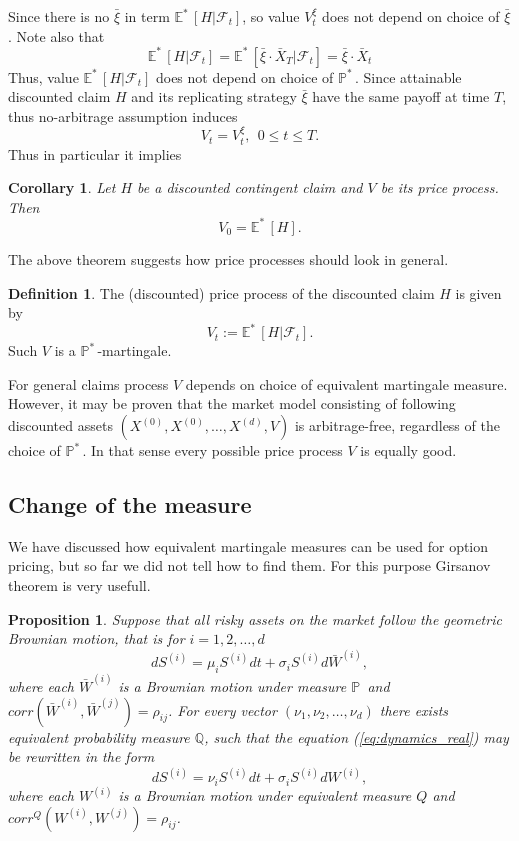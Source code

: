 \documentclass[a4paper,12pt, oneside]{book}
\newtheorem{prop}[thm]{Proposition}
\newtheorem{coro}[thm]{Corollary}
\theoremstyle{definition}
\newtheorem{mydef}{Definition}[section]
\theoremstyle{remark}
\def\P{{\mathbb{P}}\,}
\def\Em{{\mathbb{E}^*}\,}
\def\Pm{{\mathbb{P}}^*\,}
\def\Xa{\bar{X}}
\def\xia{\bar{\xi}}
\begin{document}
Since there is no $\xia$ in term $\Em[H | \mathcal{F}_t]$, so value $V^\xi_t$ does not depend on choice of $\xia$. Note also that
\begin{equation*}
 \Em[H | \mathcal{F}_t]  = \Em[\xia \cdot \Xa_T | \mathcal{F}_t]  = \xia \cdot \Xa_t
\end{equation*}
Thus, value $\Em[H | \mathcal{F}_t]$ does not depend on choice of $\Pm$. 
Since attainable discounted claim $H$ and its replicating strategy $\xia$ have the same payoff at time $T$, thus no-arbitrage assumption induces
\[ V_t = V^\xi_t,\ \ 0 \leq t \leq T. \]
Thus in particular it implies
\begin{coro}
\label{coro:price_mth}
Let $H$ be a discounted contingent claim and $V$ be its price process. Then
\begin{equation}
 \label{eq:price_mtg}
 V_0 = \Em[H].
\end{equation}
\end{coro}


The above theorem suggests how price processes should look in general.
\begin{mydef}
 The (discounted) price process of the discounted claim $H$ is given by
 \begin{equation*}
  V_t := \Em[H | \mathcal{F}_t].
 \end{equation*}
 Such $V$ is a $\Pm$-martingale.
\end{mydef}
For general claims process $V$ depends on choice of equivalent martingale measure. However, it may be proven that the market model consisting of following discounted assets $(X^{(0)}, X^{(0)},\ldots,X^{(d)}, V)$ is arbitrage-free, regardless of the choice of $\Pm$. In that sense every possible price process $V$ is equally good.

\subsection{Change of the measure}
We have discussed how equivalent martingale measures can be used for option pricing, but so far we did not tell how to find them. For this purpose Girsanov theorem is very usefull.

\begin{prop}
\label{prop:measure_change}
 Suppose that all risky assets on the market follow the geometric Brownian motion, that is for $i=1,2,\ldots,d$
 \begin{equation}
  \label{eq:dynamics_real}
  dS^{(i)} = \mu_i S^{(i)} dt + \sigma_i S^{(i)} d\bar{W}^{(i)},
 \end{equation}
 where each $\bar{W}^{(i)}$ is a Brownian motion under measure $\P$ and $corr(\bar{W}^{(i)}, \bar{W}^{(j)}) = \rho_{ij}$. For every vector $(\nu_1, \nu_2, \ldots, \nu_d)$ there exists equivalent probability measure $\mathbb{Q}$, such that the equation (\ref{eq:dynamics_real}) may be rewritten in the form
  \begin{equation}
  dS^{(i)} = \nu_i S^{(i)} dt + \sigma_i S^{(i)} dW^{(i)},
 \end{equation}
 where each $W^{(i)}$ is a Brownian motion under equivalent measure $Q$ and\\ $corr^Q(W^{(i)}, W^{(j)}) = \rho_{ij}$.
\end{prop}
\end{document}
